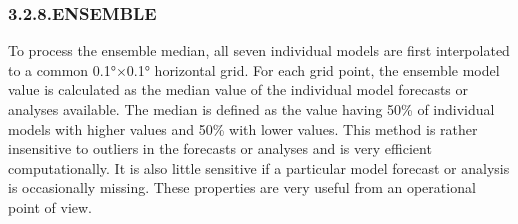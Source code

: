 \documentclass[9pt]{report}
\begin{document}
\begin{table}[h!]%
\begin{mdcenter}%
{}%
\end{mdcenter}\label{silam-portfolio}%
\end{table}%

\subsubsection{3.2.8.\hspace*{0.5em}ENSEMBLE}\label{sec-ensemble}%

\noindent{}To process the ensemble median, all seven individual models are first interpolated to a common 0.1°×0.1° horizontal grid. 
For each grid point, the ensemble model value is calculated as the median value of the individual model forecasts or analyses available. 
The median is defined as the value having 50\% of individual models with higher values and 50\% with lower values. 
This method is rather insensitive to outliers in the forecasts or analyses and is very efficient computationally. 
It is also little sensitive if a particular model forecast or analysis is occasionally missing.
These properties are very useful from an operational point of view.%
\end{document}
